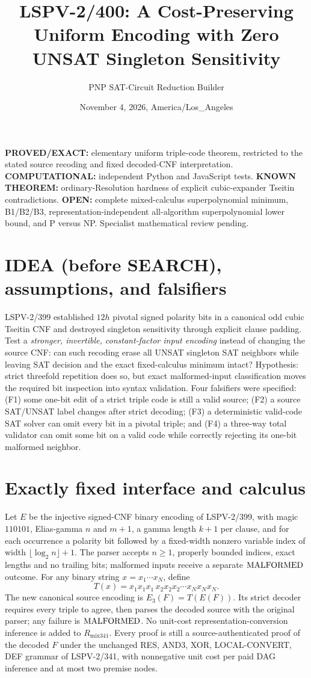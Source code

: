 \documentclass[11pt]{article}
\title{LSPV-2/400: A Cost-Preserving Uniform Encoding with Zero UNSAT Singleton Sensitivity}
\author{PNP SAT-Circuit Reduction Builder}
\date{November 4, 2026, America/Los\_Angeles}
\begin{document}
\maketitle
\noindent\textbf{PROVED/EXACT:} elementary uniform triple-code theorem, restricted to the stated source recoding and fixed decoded-CNF interpretation. \textbf{COMPUTATIONAL:} independent Python and JavaScript tests. \textbf{KNOWN THEOREM:} ordinary-Resolution hardness of explicit cubic-expander Tseitin contradictions. \textbf{OPEN:} complete mixed-calculus superpolynomial minimum, B1/B2/B3, representation-independent all-algorithm superpolynomial lower bound, and P versus NP. Specialist mathematical review pending.

\section*{IDEA (before SEARCH), assumptions, and falsifiers}
LSPV-2/399 established \(12h\) pivotal signed polarity bits in a canonical odd cubic Tseitin CNF and destroyed singleton sensitivity through explicit clause padding. Test a \emph{stronger, invertible, constant-factor input encoding} instead of changing the source CNF: can such recoding erase all UNSAT singleton SAT neighbors while leaving SAT decision and the exact fixed-calculus minimum intact? Hypothesis: strict threefold repetition does so, but exact malformed-input classification moves the required bit inspection into syntax validation. Four falsifiers were specified: (F1) some one-bit edit of a strict triple code is still a valid source; (F2) a source SAT/UNSAT label changes after strict decoding; (F3) a deterministic valid-code SAT solver can omit every bit in a pivotal triple; and (F4) a three-way total validator can omit some bit on a valid code while correctly rejecting its one-bit malformed neighbor.

\section*{Exactly fixed interface and calculus}
Let \(E\) be the injective signed-CNF binary encoding of LSPV-2/399, with magic \(110101\), Elias-gamma \(n\) and \(m+1\), a gamma length \(k+1\) per clause, and for each occurrence a polarity bit followed by a fixed-width nonzero variable index of width \(\lfloor\log_2 n\rfloor+1\). The parser accepts \(n\ge1\), properly bounded indices, exact lengths and no trailing bits; malformed inputs receive a separate \({\rm MALFORMED}\) outcome. For any binary string \(x=x_1\cdots x_N\), define
\[
T(x)=x_1x_1x_1\,x_2x_2x_2\cdots x_Nx_Nx_N.
\]
The new canonical source encoding is \(E_3(F)=T(E(F))\). Its strict decoder requires every triple to agree, then parses the decoded source with the original parser; any failure is \({\rm MALFORMED}\). No unit-cost representation-conversion inference is added to \(R_{\mathrm{mix341}}\). Every proof is still a source-authenticated proof of the decoded \(F\) under the unchanged RES, AND3, XOR, LOCAL-CONVERT, DEF grammar of LSPV-2/341, with nonnegative unit cost per paid DAG inference and at most two premise nodes.
\end{document}
